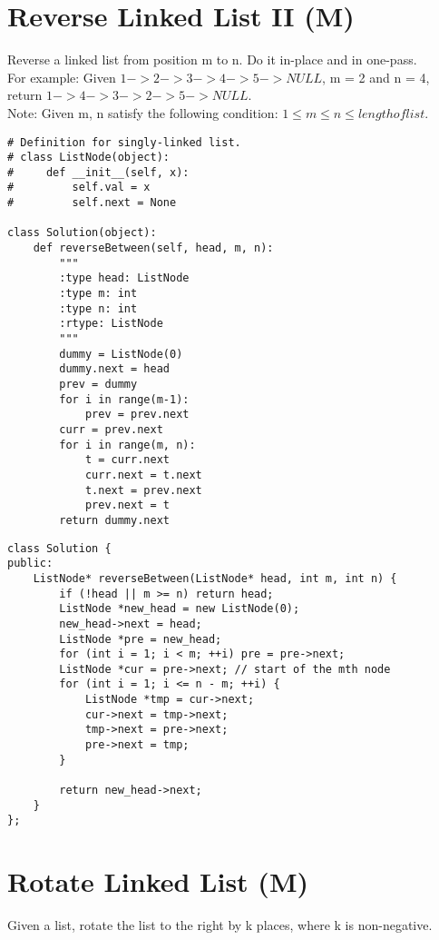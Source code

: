 \section{Reverse Linked List II (M)}
Reverse a linked list from position m to n. Do it in-place and in one-pass.\\

For example:
Given $1->2->3->4->5->NULL$, m = 2 and n = 4,
return $1->4->3->2->5->NULL$.\\

Note:
Given m, n satisfy the following condition:
$1 \leq m \leq n \leq length of list$. \\

\begin{lstlisting}
# Definition for singly-linked list.
# class ListNode(object):
#     def __init__(self, x):
#         self.val = x
#         self.next = None

class Solution(object):
    def reverseBetween(self, head, m, n):
        """
        :type head: ListNode
        :type m: int
        :type n: int
        :rtype: ListNode
        """
        dummy = ListNode(0)
        dummy.next = head
        prev = dummy
        for i in range(m-1):
            prev = prev.next
        curr = prev.next
        for i in range(m, n):
            t = curr.next
            curr.next = t.next
            t.next = prev.next
            prev.next = t
        return dummy.next
\end{lstlisting}

\begin{lstlisting}
class Solution {
public:
    ListNode* reverseBetween(ListNode* head, int m, int n) {
        if (!head || m >= n) return head;
        ListNode *new_head = new ListNode(0);
        new_head->next = head;
        ListNode *pre = new_head;
        for (int i = 1; i < m; ++i) pre = pre->next;
        ListNode *cur = pre->next; // start of the mth node
        for (int i = 1; i <= n - m; ++i) {
            ListNode *tmp = cur->next;
            cur->next = tmp->next;
            tmp->next = pre->next;
            pre->next = tmp;
        }
        
        return new_head->next;
    }
};
\end{lstlisting}


\section{Rotate Linked List (M)}
Given a list, rotate the list to the right by k places, where k is non-negative.\\

